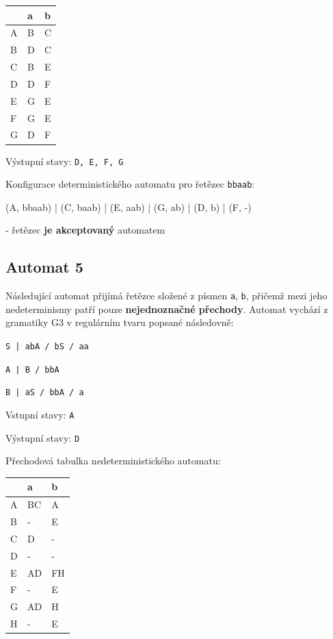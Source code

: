 \documentclass[11pt]{article}
\begin{document}
\bigskip

\begin{tabular}{| l | l | l |}
\hline
  & a & b \\ \hline
A & B & C \\ \hline
B & D & C \\ \hline
C & B & E \\ \hline
D & D & F \\ \hline
E & G & E \\ \hline
F & G & E \\ \hline
G & D & F \\
\hline
\end{tabular}

\bigskip

Výstupní stavy: \texttt{D, E, F, G}

\bigskip

Konfigurace deterministického automatu pro řetězec \texttt{bbaab}:

(A, bbaab) | (C, baab) | (E, aab) | (G, ab) | (D, b) | (F, -)

- řetězec \textbf{je akceptovaný} automatem

\newpage

\subsection{Automat 5}
Následující automat přijímá řetězce složené z písmen \texttt{a}, \texttt{b}, přičemž mezi jeho nedeterminismy patří pouze \textbf{nejednoznačné přechody}. Automat vychází z gramatiky G3 v regulárním tvaru popsané následovně: 

\texttt{S | abA / bS / aa}

\texttt{A | B / bbA}

\texttt{B | aS / bbA / a}

\bigskip

Vstupní stavy: \texttt{A}

Výstupní stavy: \texttt{D}

\bigskip

Přechodová tabulka nedeterministického automatu:

\bigskip

\begin{tabular}{| l | l | l |}
\hline
  & a & b \\ \hline
A & BC & A \\ \hline
B & - & E \\ \hline
C & D & - \\ \hline
D & - & - \\ \hline
E & AD & FH \\ \hline
F & - & E \\ \hline
G & AD & H \\ \hline
H & - & E \\
\hline
\end{tabular}
\end{document}
